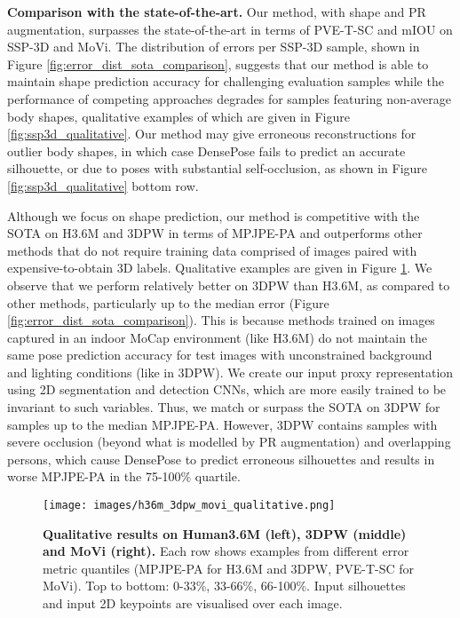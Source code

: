 \documentclass{bmvc2k}
\begin{document}
\noindent \textbf{Comparison with the state-of-the-art.} Our method, with shape and PR augmentation, surpasses the state-of-the-art in terms of PVE-T-SC and mIOU on SSP-3D and MoVi. The distribution of errors per SSP-3D sample, shown in Figure \ref{fig:error_dist_sota_comparison}, suggests that our method is able to maintain shape prediction accuracy for challenging evaluation samples while the performance of competing approaches degrades for samples featuring non-average body shapes, qualitative examples of which are given in Figure \ref{fig:ssp3d_qualitative}. Our method may give erroneous reconstructions for outlier body shapes, in which case DensePose fails to predict an accurate silhouette, or due to poses with substantial self-occlusion, as shown in Figure \ref{fig:ssp3d_qualitative} bottom row.

Although we focus on shape prediction, our method is competitive with the SOTA on H3.6M and 3DPW in terms of MPJPE-PA and outperforms other methods that do not require training data comprised of images paired with expensive-to-obtain 3D labels. Qualitative examples are given in Figure \ref{fig:h36m_3dpw_movi_qualitative}. We observe that we perform relatively better on 3DPW than H3.6M, as compared to other methods, particularly up to the median error (Figure \ref{fig:error_dist_sota_comparison}). This is because methods trained on images captured in an indoor MoCap environment (like H3.6M) do not maintain the same pose prediction accuracy for test images with unconstrained background and lighting conditions (like in 3DPW). We create our input proxy representation using 2D segmentation and detection CNNs, which are more easily trained to be invariant to such variables. Thus, we match or surpass the SOTA on 3DPW for samples up to the median MPJPE-PA. However, 3DPW contains samples with severe occlusion (beyond what is modelled by PR augmentation) and overlapping persons, which cause DensePose to predict erroneous silhouettes and results in worse MPJPE-PA in the 75-100\% quartile.

\begin{figure}
    \centering
    \texttt{[image: images/h36m\_3dpw\_movi\_qualitative.png]}
    \caption{\textbf{Qualitative results on Human3.6M (left), 3DPW (middle) and MoVi (right).} Each row shows examples from different error metric quantiles (MPJPE-PA for H3.6M and 3DPW, PVE-T-SC for MoVi). Top to bottom: 0-33\%, 33-66\%, 66-100\%. Input silhouettes and input 2D keypoints are visualised over each image.}
    \label{fig:h36m_3dpw_movi_qualitative}
    \vspace{-0.2cm}
\end{figure}
\end{document}
